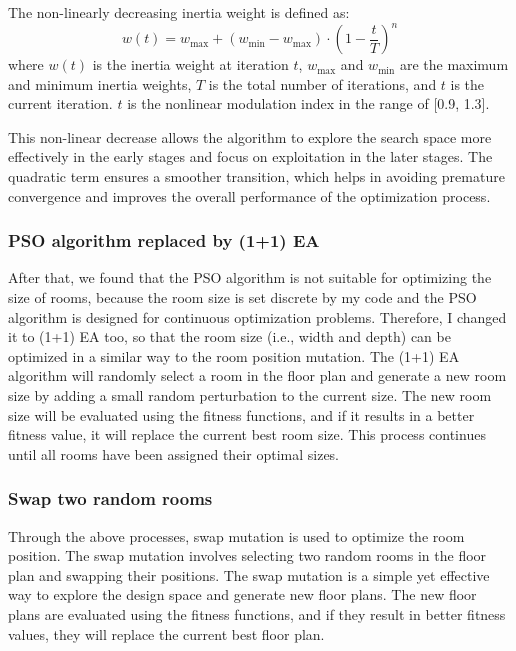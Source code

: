 \documentclass[]{article}
\begin{document}
The non-linearly decreasing inertia weight is defined as:
\begin{equation*}
    w(t) = w_{\text{max}} + (w_{\text{min}} - w_{\text{max}}) \cdot \left(1 - \frac{t}{T}\right)^n
\end{equation*}
where $w(t)$ is the inertia weight at iteration $t$, $w_{\text{max}}$ and $w_{\text{min}}$ are the maximum and minimum inertia weights, $T$ is the total number of iterations, and $t$ is the current iteration. $t$ is the nonlinear modulation index in the range of [0.9, 1.3].

This non-linear decrease allows the algorithm to explore the search space more effectively in the early stages and focus on exploitation in the later stages. The quadratic term ensures a smoother transition, which helps in avoiding premature convergence and improves the overall performance of the optimization process.

\subsubsection{PSO algorithm replaced by (1+1) EA}
After that, we found that the PSO algorithm is not suitable for optimizing the size of rooms, because the room size is set discrete by my code and the PSO algorithm is designed for continuous optimization problems. Therefore, I changed it to (1+1) EA too, so that the room size (i.e., width and depth) can be optimized in a similar way to the room position mutation. The (1+1) EA algorithm will randomly select a room in the floor plan and generate a new room size by adding a small random perturbation to the current size. The new room size will be evaluated using the fitness functions, and if it results in a better fitness value, it will replace the current best room size. This process continues until all rooms have been assigned their optimal sizes.

\subsubsection{Swap two random rooms}
Through the above processes, swap mutation is used to optimize the room position. The swap mutation involves selecting two random rooms in the floor plan and swapping their positions. The swap mutation is a simple yet effective way to explore the design space and generate new floor plans. The new floor plans are evaluated using the fitness functions, and if they result in better fitness values, they will replace the current best floor plan.
\end{document}

